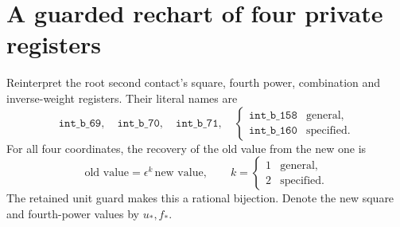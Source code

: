 \documentclass[11pt]{article}
\begin{document}
\section{A guarded rechart of four private registers}

Reinterpret the root second contact's square, fourth power,
combination and inverse-weight registers. Their literal names are
\[
 \texttt{int\_b\_69},\quad\texttt{int\_b\_70},\quad
 \texttt{int\_b\_71},\quad
 \begin{cases}
 \texttt{int\_b\_158}&\text{general},\\
 \texttt{int\_b\_160}&\text{specified}.
 \end{cases}
\]
For all four coordinates, the recovery of the old value from the new
one is
\begin{equation}\label{rechart}
 \text{old value}=\epsilon^k\,\text{new value},\qquad
 k=\begin{cases}1&\text{general},\\2&\text{specified}.\end{cases}
\end{equation}
The retained unit guard makes this a rational bijection. Denote the
new square and fourth-power values by \(u_*,f_*\).
\end{document}
